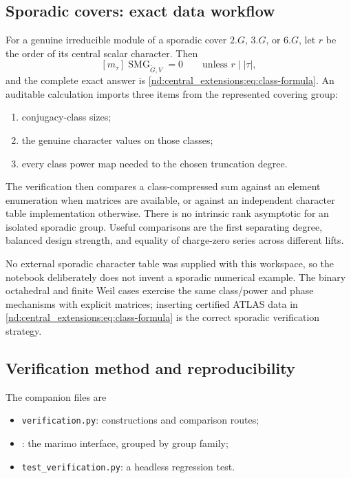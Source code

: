 \documentclass[10pt]{article}
\newcommand{\SMG}{\operatorname{SMG}}
\newcommand{\MGF}{\SMG}
\begin{document}
\subsection{Sporadic covers: exact data workflow}

For a genuine irreducible module of a sporadic cover $2.G$, $3.G$, or $6.G$,
let $r$ be the order of its central scalar character.  Then
\[
 [m_\tau]\MGF_{\widetilde G,V}=0\qquad\text{unless }r\mid|\tau|,
\]
and the complete exact answer is \eqref{nd:central_extensions:eq:class-formula}.  An auditable
calculation imports three items from the represented covering group:
\begin{enumerate}
\item conjugacy-class sizes;
\item the genuine character values on those classes;
\item every class power map needed to the chosen truncation degree.
\end{enumerate}
The verification then compares a class-compressed sum against an element
enumeration when matrices are available, or against an independent character
table implementation otherwise.  There is no intrinsic rank asymptotic for
an isolated sporadic group.  Useful comparisons are the first separating
degree, balanced design strength, and equality of charge-zero series across
different lifts.

No external sporadic character table was supplied with this workspace, so
the notebook deliberately does not invent a sporadic numerical example.  The
binary octahedral and finite Weil cases exercise the same class/power and
phase mechanisms with explicit matrices; inserting certified ATLAS data in
\eqref{nd:central_extensions:eq:class-formula} is the correct sporadic verification strategy.

\subsection{Verification method and reproducibility}

The companion files are
\begin{itemize}
\item \texttt{verification.py}: constructions and comparison routes;
\item {}: the marimo interface,
grouped by group family;
\item \texttt{test\_verification.py}: a headless regression test.
\end{itemize}
\end{document}

